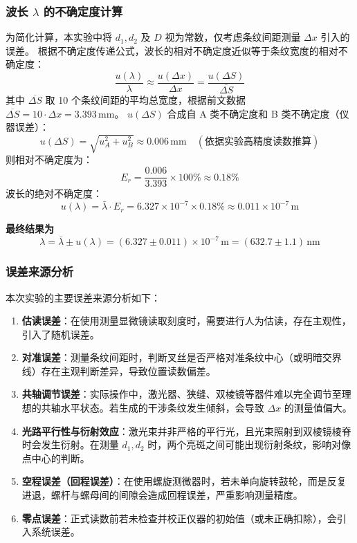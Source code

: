 \documentclass[]{../../templates/Report}%
\begin{document}
\begin{fullreportonly}
\subsubsection{波长 $\lambda$ 的不确定度计算}
为简化计算，本实验中将 $d_1, d_2$ 及 $D$ 视为常数，仅考虑条纹间距测量 $\Delta x$ 引入的误差。
根据不确定度传递公式，波长的相对不确定度近似等于条纹宽度的相对不确定度：
\[
\frac{u(\lambda)}{\lambda} \approx \frac{u(\Delta x)}{\Delta x} = \frac{u(\Delta S)}{\overline{\Delta S}}
\]
其中 $\overline{\Delta S}$ 取 10 个条纹间距的平均总宽度，根据前文数据 $\overline{\Delta S} = 10 \cdot \Delta x = 3.393\,\text{mm}$。
$u(\Delta S)$ 合成自 A 类不确定度和 B 类不确定度（仪器误差）：
\[
u(\Delta S) = \sqrt{u_A^2 + u_B^2} \approx 0.006\,\text{mm} \quad (\text{依据实验高精度读数推算})
\]
则相对不确定度为：
\[
E_r = \frac{0.006}{3.393} \times 100\% \approx 0.18\%
\]
波长的绝对不确定度：
\[
u(\lambda) = \bar{\lambda} \cdot E_r = 6.327 \times 10^{-7} \times 0.18\% \approx 0.011 \times 10^{-7}\,\text{m}
\]

\textbf{最终结果为}
\[
\lambda = \bar{\lambda} \pm u(\lambda) = (6.327 \pm 0.011) \times 10^{-7}\,\text{m} = (632.7 \pm 1.1)\,\text{nm}
\]

\subsubsection{误差来源分析}
本次实验的主要误差来源分析如下：
\begin{enumerate}
    \item \textbf{估读误差}：在使用测量显微镜读取刻度时，需要进行人为估读，存在主观性，引入了随机误差。
    \item \textbf{对准误差}：测量条纹间距时，判断叉丝是否严格对准条纹中心（或明暗交界线）存在主观判断差异，导致位置读数偏差。
    \item \textbf{共轴调节误差}：实际操作中，激光器、狭缝、双棱镜等器件难以完全调节至理想的共轴水平状态。若生成的干涉条纹发生倾斜，会导致 $\Delta x$ 的测量值偏大。
    \item \textbf{光路平行性与衍射效应}：激光束并非严格的平行光，且光束照射到双棱镜棱脊时会发生衍射。在测量 $d_1, d_2$ 时，两个亮斑之间可能出现衍射条纹，影响对像点中心的判断。
    \item \textbf{空程误差（回程误差）}：在使用螺旋测微器时，若未单向旋转鼓轮，而是反复进退，螺杆与螺母间的间隙会造成回程误差，严重影响测量精度。
    \item \textbf{零点误差}：正式读数前若未检查并校正仪器的初始值（或未正确扣除），会引入系统误差。
\end{enumerate}



\end{fullreportonly}
\end{document}

